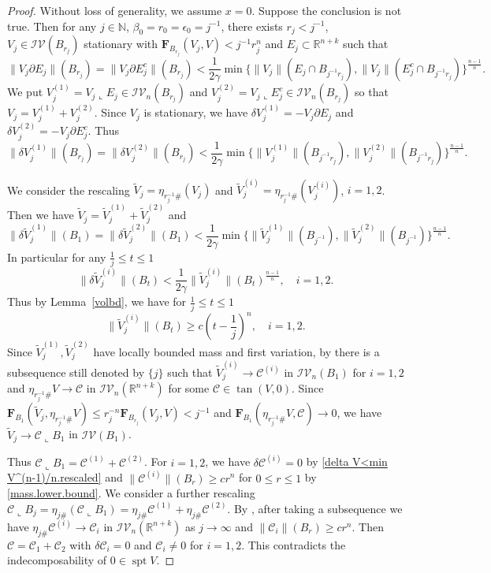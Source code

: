 \documentclass[11pt]{amsart}
\theoremstyle{definition}
\newcommand{\R}{\mathbb{R}}
\newcommand{\N}{\mathbb{N}}
\newcommand{\C}{\mathcal{C}}
\newcommand{\IV}{\mathcal{IV}}
\DeclareMathOperator{\spt}{spt}
\begin{document}
    
\begin{proof}Without loss of generality, we assume $x=0$.
	Suppose the conclusion is not true. Then for any $j\in\N$, $\beta_0=r_0=\epsilon_0=j^{-1}$, there exists $r_{j}<j^{-1}$, $V_j\in \IV(B_{r_j})$ stationary  with $\mathbf{F}_{B_{r_j}}(V_j,V)<j^{-1} r_j^n$ and $E_j\subset \R^{n+k}$ such that \[\|V_j\partial E_j\|(B_{r_j})=\|V_j\partial E_j^c\|(B_{r_j})< \frac{1}{2\gamma}\min\{\|V_j\|( E_j\cap B_{j^{-1} r_j}),\|V_j\|(E_j^c\cap B_{j^{-1} r_j})\}^{\frac{n-1}{n}}.\]
    We put $V_j^{(1)}=V_j\llcorner E_j\in \IV_n(B_{r_{j}})$ and $V_j^{(2)}=V_j\llcorner E_j^c\in \IV_n(B_{r_{j}})$ so that $V_j=V_j^{(1)}+V_j^{(2)}$. Since $V_j$ is stationary, we have $\delta V_j^{(1)}=-V_j\partial E_j$ and $\delta V_j^{(2)}=-V_j\partial E_j^c$. Thus
    \[\|\delta V_j^{(1)}\|(B_{r_j})=\|\delta V_j^{(2)}\|(B_{r_j})<\frac{1}{2\gamma}\min\{\|V_j^{(1)}\|( B_{j^{-1} r_j}),\|V_j^{(2)}\|(B_{j^{-1} r_j})\}^{\frac{n-1}{n}}.\]
     
	We consider the rescaling $\tilde V_j=\eta_{r_j^{-1}\#}(V_j)$ and $\tilde V_j^{(i)}=\eta_{r_j^{-1}\#}(V_j^{(i)})$, $i=1,2$. Then we have $\tilde V_j=\tilde V_j^{(1)}+\tilde V_j^{(2)}$ and
	\begin{equation}\label{delta V<min V^(n-1)/n.rescaled}
	    \|\delta \tilde V_j^{(1)}\|(B_1)=\|\delta \tilde V_j^{(2)}\|(B_1)< \frac{1}{2\gamma}\min\{\|\tilde V_j^{(1)}\|(B_{j^{-1}}),\|\tilde V_j^{(2)}\|( B_{j^{-1}})\}^{\frac{n-1}{n}}.
	\end{equation}
	In particular for any $\frac{1}{j}\le t\le 1$
	\[
	    \|\delta \tilde V_j^{(i)}\|(B_t)< \frac{1}{2\gamma}\|\tilde V_j^{(i)}\|(B_t)^{\frac{n-1}{n}},\quad i=1,2.
	\]
	Thus by Lemma~\ref{volbd}, we have for $\frac{1}{j}\le t\le 1$
	\begin{equation}\label{mass.lower.bound}\|\tilde V_j^{(i)}\|(B_t)\ge c(t-\frac{1}{j})^{n},\quad i=1,2.\end{equation}
	Since $\tilde V_j^{(1)},\tilde V_j^{(2)}$ have locally bounded mass and first variation, by \cite[Theorem 42.7]{Sim} there is a subsequence still denoted by $\{j\}$ such that $\tilde V_j^{(i)}\to \C^{(i)}$ in $\IV_n(B_1)$ for $i=1,2$ and $\eta_{r_j^{-1}\#}V\to \C$ in $\IV_n(\R^{n+k})$ for some $\C\in \tan(V,0)$. Since $\mathbf{F}_{B_1}(\tilde V_j,\eta_{r_j^{-1}\#}V)\le r_j^{-n}\mathbf{F}_{B_{r_j}}(V_j,V)<j^{-1}$ and $\mathbf{F}_{B_1}(\eta_{r_j^{-1}\#}V,\C)\to0$, we have $\tilde V_j\to \C\llcorner B_1$ in $\IV(B_1)$. 
    
    Thus $\C\llcorner B_1=\C^{(1)}+\C^{(2)}$. For $i=1,2$, we have $\delta \C^{(i)}=0$ by \eqref{delta V<min V^(n-1)/n.rescaled} and $\|\C^{(i)}\|(B_r)\ge cr^n$ for $0\le r\le 1$ by \eqref{mass.lower.bound}. We consider a further rescaling $\C\llcorner B_j=\eta_{j\#}(\C \llcorner B_1)=\eta_{j\#}\C^{(1)}+\eta_{j\#}\C^{(2)}$. By \cite[Theorem 42.7]{Sim}, after taking a subsequence we have  $\eta_{j\#}\C^{(i)}\to \C_i$ in $\IV_n(\R^{n+k})$ as $j\to\infty$ and $\|\C_i\|(B_r)\ge cr^n$. Then $\C=\C_1+\C_2$ with $\delta \C_i=0$ and $\C_i\neq0$ for $i=1,2$.
	This contradicts the indecomposability of $0\in\spt V$.
\end{proof}
\end{document}
